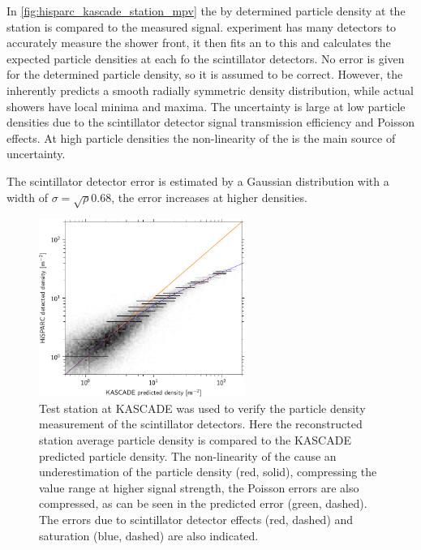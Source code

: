 In \cref{fig:hisparc_kascade_station_mpv} the by \kascade determined particle density at the station is compared to the measured signal. \kascade experiment has many detectors to accurately measure the shower front, it then fits an \ldf to this and calculates the expected particle densities at each fo the \hisparc scintillator detectors. No error is given for the \kascade determined particle density, so it is assumed to be correct. However, the \ldf inherently predicts a smooth radially symmetric density distribution, while actual showers have local minima and maxima. The uncertainty is large at low particle densities due to the scintillator detector signal transmission efficiency and Poisson effects. At high particle densities the non-linearity of the \pmt is the main source of uncertainty.

The scintillator detector error is estimated by a Gaussian distribution with a width of $\sigma = \sqrt{\rho} 0.68$, the error increases at higher densities.

\begin{figure}
    \centering
    \includegraphics[width=0.6\textwidth]
                    {plots/station/hisparc_kascade_station_mpv}
    \caption{Test station at KASCADE was used to verify the particle density measurement of the scintillator detectors. Here the reconstructed station average particle density is compared to the KASCADE predicted particle density. The non-linearity of the \pmts cause an underestimation of the \hisparc particle density (red, solid), compressing the value range at higher signal strength, the Poisson errors are also compressed, as can be seen in the predicted error (green, dashed). The errors due to scintillator detector effects (red, dashed) and \pmt saturation (blue, dashed) are also indicated.}
    \label{hisparc_kascade_station_mpv}
\end{figure}

